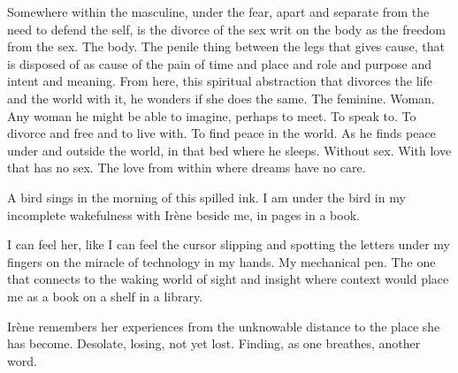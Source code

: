 

﻿Somewhere within the masculine, under the fear, apart and separate from the need to defend the self, is the divorce of the sex writ on the body as the freedom from the sex.  The body.  The penile thing between the legs that gives cause, that is disposed of as cause of the pain of time and place and role and purpose and intent and meaning.  From here, this spiritual abstraction that divorces the life and the world with it, he wonders if she does the same.  The feminine.  Woman.  Any woman he might be able to imagine, perhaps to meet.  To speak to.  To divorce and free and to live with.  To find peace in the world.  As he finds peace under and outside the world, in that bed where he sleeps.  Without sex.  With love that has no sex.  The love from within where dreams have no care.


A bird sings in the morning of this spilled ink.  I am under the bird in my incomplete wakefulness with Irène beside me, in pages in a book.


I can feel her, like I can feel the cursor slipping and spotting the letters under my fingers on the miracle of technology in my hands.  My mechanical pen.  The one that connects to the waking world of sight and insight where context would place me as a book on a shelf in a library.


Irène remembers her experiences from the unknowable distance to the place she has become.  Desolate, losing, not yet lost.  Finding, as one breathes, another word.
\bye
